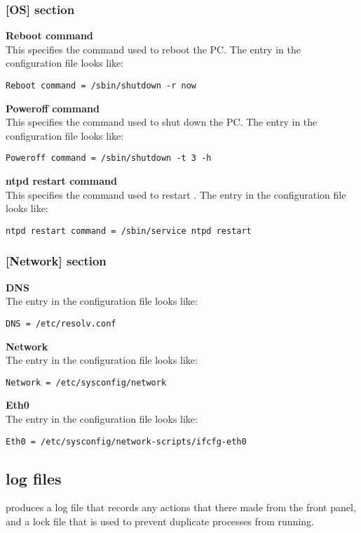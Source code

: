 \subsubsection{[OS] section}
{\bfseries Reboot command}\\
This specifies the command used to reboot the PC.
The entry in the configuration file looks like:
\begin{lstlisting}
Reboot command = /sbin/shutdown -r now
\end{lstlisting}
{\bfseries Poweroff command}\\
This specifies the command used to shut down the PC.
The entry in the configuration file looks like:
\begin{lstlisting}
Poweroff command = /sbin/shutdown -t 3 -h
\end{lstlisting}
{\bfseries ntpd restart command}\\
This specifies the command used to restart .
The entry in the configuration file looks like:
\begin{lstlisting}
ntpd restart command = /sbin/service ntpd restart
\end{lstlisting}

\subsubsection{[Network] section}
{\bfseries DNS}\\
The entry in the configuration file looks like:
\begin{lstlisting}
DNS = /etc/resolv.conf
\end{lstlisting}
{\bfseries Network}\\
The entry in the configuration file looks like:
\begin{lstlisting}
Network = /etc/sysconfig/network
\end{lstlisting}
{\bfseries Eth0}\\
The entry in the configuration file looks like:
\begin{lstlisting}
Eth0 = /etc/sysconfig/network-scripts/ifcfg-eth0
\end{lstlisting}

\subsection{log files}
 produces a log file  that records any
actions that there made from the front panel, and a lock file 
that is used to prevent duplicate processes from running.